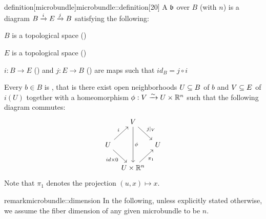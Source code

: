 \begin{mystatement}{definition}[microbundle]{microbundle::definition}[20]
    A  $\bb$ over $B$ (with  $n$)
    is a diagram $\bundle{B}{E}{i}{j}$ satisfying the following:
    \begin{properties}
        \item $B$ is a topological space ()
        \item $E$ is a topological space ()
        \item $i: B \to E$ () and $j: E \to B$ ()
        are maps such that $id_B = j \circ i$
        \item Every $b \in B$ is ,
        that is there exist open neighborhoods $U \sub B$ of $b$ and $V \sub E$ of $i(U)$
        together with a homeomorphism $\phi: V \isomto U \cross \R^n$ such that the following diagram commutes:
        \[
            \begin{tikzcd}[column sep=tiny]
                & V \ar[dr, "j\vert_V"] \ar[dd, "\phi"] & \\
                U \ar[ur, "i"] \ar[dr, "{id \cross 0}"'] & & U \\
                & U \cross\R^n \ar[ur, "\pi_1"'] &
            \end{tikzcd}
        \]
        Note that $\pi_1$ denotes the projection $(u, x) \mapsto x$.
    \end{properties}
\end{mystatement}

\begin{mystatement}{remark}{microbundle::dimension}
    In the following, unless explicitly stated otherwise,
    we assume the fiber dimension of any given microbundle to be $n$.
\end{mystatement}